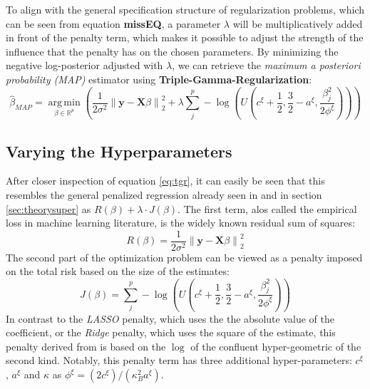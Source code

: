 \documentclass[12pt,a4paper]{article}
\newcommand{\norm}[1]{\left\lVert#1\right\rVert}
\DeclareMathOperator*{\argmin}{arg\,min}
\begin{document}
To align with the general specification structure of regularization problems, which can be seen from equation \textbf{missEQ}, a parameter $\lambda$ will be multiplicatively added in front of the penalty term, which makes it possible to adjust the strength of the influence that the penalty has on the chosen parameters. By minimizing the negative log-posterior adjusted with $\lambda$, we can retrieve the \textit{maximum a posteriori probability (MAP)} estimator using \textbf{Triple-Gamma-Regularization}:
\begin{equation}\label{eq:tgr}
\hat{\beta}_{MAP} = \underset{\beta \in \mathbb{R}^p}{\argmin} \left(\frac{1}{2\sigma^2}\norm{\mathbf{y} - \mathbf{X}\beta}_2^2 + \lambda \sum_j^p -\log\left(U\left(c^\xi + \frac{1}{2}, \frac{3}{2}-a^\xi, \frac{\beta_j^2}{2\phi^\xi}\right)\right)\right) 
\end{equation}

\newpage
\subsection{Varying the Hyperparameters}
After closer inspection of equation \ref{eq:tgr}, it can easily be seen that this resembles the general penalized regression already seen in \textcite{ESLpage398} and in section \ref{sec:theorysuper} as $R(\beta) + \lambda\cdot J(\beta)$. The first term, alos called the empirical loss in machine learning literature, is the widely known residual sum of squares:
\[
R(\beta)=\frac{1}{2\sigma^2}\norm{\mathbf{y} - \mathbf{X}\beta}_2^2
\] 
The second part of the optimization problem can be viewed as a penalty imposed on the total risk based on the size of the estimates:
\[
J(\beta) = \sum_j^p -\log\left(U\left(c^\xi + \frac{1}{2}, \frac{3}{2}-a^\xi, \frac{\beta_j^2}{2\phi^\xi}\right)\right)
\]
In contrast to the \textit{LASSO} penalty, which uses the the absolute value of the coefficient, or the \textit{Ridge} penalty, which uses the square of the estimate, this penalty derived from \textcite{TGP2020} is based on the $\log$ of the confluent hyper-geometric of the second kind. Notably, this penalty term has three additional hyper-parameters: $c^\xi$, $a^\xi$ and $\kappa$ as $\phi^\xi = (2c^\xi)/(\kappa^2_B a^\xi)$.
\end{document}
